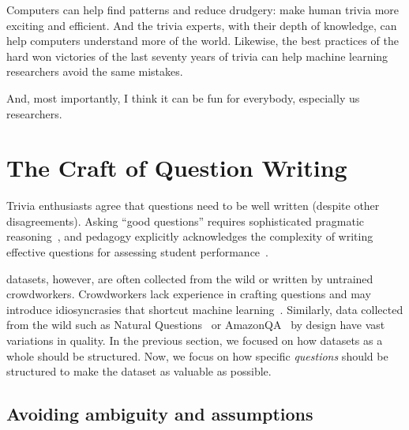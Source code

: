 Computers can help find patterns and reduce drudgery: make human trivia more exciting and efficient.  And the trivia experts, with their depth of knowledge, can help computers understand more of the world.  Likewise, the best practices of the hard won victories of the last seventy years of trivia can help machine learning researchers avoid the same mistakes.

And, most importantly, I think it can be fun for everybody, especially us researchers.
 
\section{The Craft of Question Writing}
\label{sec:craft}

Trivia enthusiasts agree that questions need to be well written (despite other disagreements).
Asking ``good questions'' requires sophisticated pragmatic reasoning~\citep{hawkins-15}, and pedagogy explicitly acknowledges the complexity of writing effective questions for assessing student performance~\citep[focusing on multiple choice questions]{Haladyna-04}. 

 datasets, however, are often collected from the wild or written by untrained
crowdworkers.
Crowdworkers lack experience in 
crafting questions and may introduce idiosyncrasies that shortcut machine learning~\citep{geva-19}.  
Similarly, data collected from the wild
such as Natural Questions~\citep{kwiatkowski-19} or AmazonQA~\citep{gupta-19} by design have vast variations in quality.
In the previous section, we focused on how datasets as a whole should be structured.
Now, we focus on how specific \emph{questions} should be structured to make the dataset as valuable as possible.


\subsection{Avoiding ambiguity and assumptions}
\label{sec:ambiguity}

